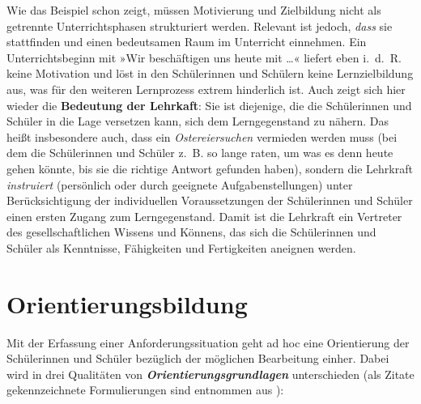 \documentclass[
]{scrbook}
\theoremstyle{definition}
\theoremstyle{definition}
\theoremstyle{definition}
\theoremstyle{definition}
\theoremstyle{remark}
\begin{document}
Wie das Beispiel schon zeigt, müssen Motivierung und Zielbildung nicht als getrennte Unterrichtsphasen strukturiert werden. Relevant ist jedoch, \emph{dass} sie stattfinden und einen bedeutsamen Raum im Unterricht einnehmen. Ein Unterrichtsbeginn mit »Wir beschäftigen uns heute mit \ldots« liefert eben i.~d.~R. keine Motivation und löst in den Schülerinnen und Schülern keine Lernzielbildung aus, was für den weiteren Lernprozess extrem hinderlich ist. Auch zeigt sich hier wieder die \textbf{Bedeutung der Lehrkaft}: Sie ist diejenige, die die Schülerinnen und Schüler in die Lage versetzen kann, sich dem Lerngegenstand zu nähern. Das heißt insbesondere auch, dass ein \emph{Ostereiersuchen} vermieden werden muss (bei dem die Schülerinnen und Schüler z.~B. so lange raten, um was es denn heute gehen könnte, bis sie die richtige Antwort gefunden haben), sondern die Lehrkraft \emph{instruiert} (persönlich oder durch geeignete Aufgabenstellungen) unter Berücksichtigung der individuellen Voraussetzungen der Schülerinnen und Schüler einen ersten Zugang zum Lerngegenstand. Damit ist die Lehrkraft ein Vertreter des gesellschaftlichen Wissens und Könnens, das sich die Schülerinnen und Schüler als Kenntnisse, Fähigkeiten und Fertigkeiten aneignen werden.

\section{Orientierungsbildung}\label{orientierungsbildung}

Mit der Erfassung einer Anforderungssituation geht ad hoc eine Orientierung der Schülerinnen und Schüler bezüglich der möglichen Bearbeitung einher. Dabei wird in drei Qualitäten von \textbf{\emph{Orientierungsgrundlagen}} unterschieden (als Zitate gekennzeichnete Formulierungen sind entnommen aus ):
\end{document}
